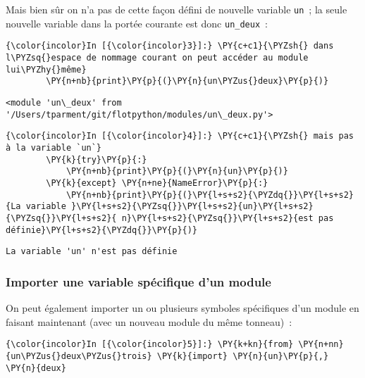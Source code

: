     Mais bien sûr on n'a pas de cette façon défini de nouvelle variable
\texttt{un}~; la seule nouvelle variable dans la portée courante est
donc \texttt{un\_deux}~:

    \begin{Verbatim}[commandchars=\\\{\}]
{\color{incolor}In [{\color{incolor}3}]:} \PY{c+c1}{\PYZsh{} dans l\PYZsq{}espace de nommage courant on peut accéder au module lui\PYZhy{}même}
        \PY{n+nb}{print}\PY{p}{(}\PY{n}{un\PYZus{}deux}\PY{p}{)}
\end{Verbatim}


    \begin{Verbatim}[commandchars=\\\{\}]
<module 'un\_deux' from '/Users/tparment/git/flotpython/modules/un\_deux.py'>

    \end{Verbatim}

    \begin{Verbatim}[commandchars=\\\{\}]
{\color{incolor}In [{\color{incolor}4}]:} \PY{c+c1}{\PYZsh{} mais pas à la variable `un`}
        \PY{k}{try}\PY{p}{:}
            \PY{n+nb}{print}\PY{p}{(}\PY{n}{un}\PY{p}{)}
        \PY{k}{except} \PY{n+ne}{NameError}\PY{p}{:} 
            \PY{n+nb}{print}\PY{p}{(}\PY{l+s+s2}{\PYZdq{}}\PY{l+s+s2}{La variable }\PY{l+s+s2}{\PYZsq{}}\PY{l+s+s2}{un}\PY{l+s+s2}{\PYZsq{}}\PY{l+s+s2}{ n}\PY{l+s+s2}{\PYZsq{}}\PY{l+s+s2}{est pas définie}\PY{l+s+s2}{\PYZdq{}}\PY{p}{)}
\end{Verbatim}


    \begin{Verbatim}[commandchars=\\\{\}]
La variable 'un' n'est pas définie

    \end{Verbatim}

    \hypertarget{importer-une-variable-spuxe9cifique-dun-module}{%
\subsubsection{Importer une variable spécifique d'un
module}\label{importer-une-variable-spuxe9cifique-dun-module}}

    On peut également importer un ou plusieurs symboles spécifiques d'un
module en faisant maintenant (avec un nouveau module du même tonneau)~:

    \begin{Verbatim}[commandchars=\\\{\}]
{\color{incolor}In [{\color{incolor}5}]:} \PY{k+kn}{from} \PY{n+nn}{un\PYZus{}deux\PYZus{}trois} \PY{k}{import} \PY{n}{un}\PY{p}{,} \PY{n}{deux}
\end{Verbatim}


